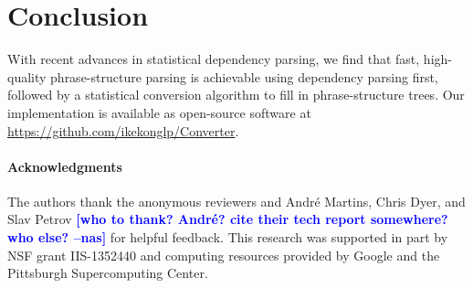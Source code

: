 \documentclass[11pt,letterpaper]{article}
\newcommand{\RuleA}[3]{#1 \rightarrow #2^*\ #3}
\newcommand{\RuleB}[3]{#1 \rightarrow #2\ #3^*}
\newcommand{\ParserUrl}{\url{https://github.com/ikekonglp/Converter}}
\newcommand{\nascomment}[1]{\textcolor{blue}{\bf \small [#1 --nas]}}
\begin{document}



\section{Conclusion}

With recent advances in statistical dependency parsing, we find that
fast, high-quality phrase-structure parsing is achievable using dependency
parsing first, followed by a statistical conversion algorithm to
fill in phrase-structure trees. 
Our implementation is available as open-source software at \ParserUrl.

\paragraph{Acknowledgments}
The authors thank the anonymous reviewers
and Andr\'{e} Martins, Chris Dyer, and Slav Petrov \nascomment{who to thank?  Andr\'{e}?  cite their tech report
  somewhere?  who else?} for helpful feedback.
This research was supported in part by NSF grant IIS-1352440 and computing resources provided by Google and the Pittsburgh Supercomputing Center.











\end{document}
